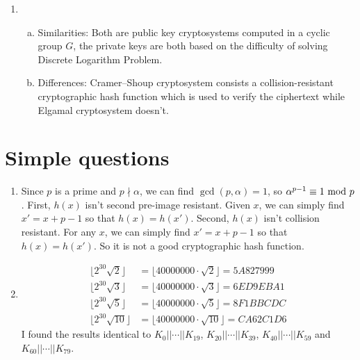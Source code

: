 \documentclass{article}
\renewcommand{\mod}{{\rm\ mod\ }}
\begin{document}
\begin{enumerate}
\item
\begin{enumerate}[a)]
\item Similarities: Both are public key cryptosystems computed in a cyclic group $G$, the private keys are both based on the difficulty of solving Discrete Logarithm Problem.
\item Differences: Cramer–Shoup cryptosystem consists a collision-resistant cryptographic hash function which is used to verify the ciphertext while Elgamal cryptosystem doesn't.

\end{enumerate}

\end{enumerate}


\section{Simple questions}
\begin{enumerate}
\item
Since $p$ is a prime and $p\nmid \alpha$, we can find $\gcd(p,\alpha)=1$, so $\alpha^{p-1}\equiv 1\mod p$. First, $h(x)$ isn't second pre-image resistant. Given $x$, we can simply find $x'=x+p-1$ so that $h(x)=h(x')$. Second, $h(x)$ isn't collision resistant. For any $x$, we can simply find $x'=x+p-1$ so that $h(x)=h(x')$. So it is not a good cryptographic hash function.
\item
\begin{align*}
\lfloor2^{30}\sqrt{2}\rfloor&=\lfloor40000000\cdot\sqrt{2}\rfloor=5A827999 \\
\lfloor2^{30}\sqrt{3}\rfloor&=\lfloor40000000\cdot\sqrt{3}\rfloor=6ED9EBA1 \\
\lfloor2^{30}\sqrt{5}\rfloor&=\lfloor40000000\cdot\sqrt{5}\rfloor=8F1BBCDC \\
\lfloor2^{30}\sqrt{10}\rfloor&=\lfloor40000000\cdot\sqrt{10}\rfloor=CA62C1D6
\end{align*}
I found the results identical to $K_0||\cdots||K_{19}$, $K_{20}||\cdots||K_{39}$, $K_{40}||\cdots||K_{59}$ and $K_{60}||\cdots||K_{79}$.
\end{enumerate}
\end{document}
